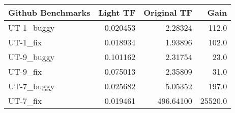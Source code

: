 \documentclass[14pt]{article}
\begin{document}
\begin{tabular}{lrrr}
\toprule
Github Benchmarks &  Light TF &  Original TF &     Gain \\
\midrule
 UT-1\_buggy &  0.020453 &      2.28324 &    112.0 \\
 UT-1\_fix   &  0.018934 &      1.93896 &    102.0 \\
 UT-9\_buggy &  0.101162 &      2.31754 &     23.0 \\
 UT-9\_fix   &  0.075013 &      2.35809 &     31.0 \\
 UT-7\_buggy &  0.025682 &      5.05352 &    197.0 \\
 UT-7\_fix   &  0.019461 &    496.64100 &  25520.0 \\
\bottomrule
\end{tabular}
\end{document}

